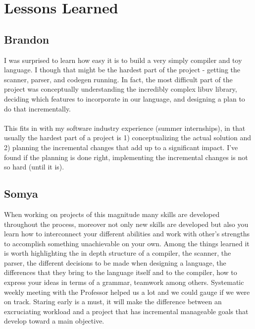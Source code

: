 \documentclass[./Report_main.tex]{subfiles}
\begin{document}


\chapter{Lessons Learned}
\section{Brandon}
I was surprised to learn how easy it is to build a very simply compiler and toy language. I though that might be the hardest part of the project - getting the scanner, parser, and codegen running. In fact, the most difficult part of the project was conceptually understanding the incredibly complex libuv library, deciding which features to incorporate in our language, and designing a plan to do that incrementally.\\\\
This fits in with my software industry experience (summer internships), in that usually the hardest part of a project is 1) conceptualizing the actual solution and 2) planning the incremental changes that add up to a significant impact. I've found if the planning is done right, implementing the incremental changes is not so hard (until it is).
\section{Somya}
When working on projects of this magnitude many skills are developed throughout the
process, moreover not only new skills are developed but also you learn how to interconnect
your different abilities and work with other's strengths to accomplish something unachievable on
your own.
Among the things learned it is worth highlighting the in depth structure of a compiler, the
scanner, the parser, the different decisions to be made when designing a language, the
differences that they bring to the language itself and to the compiler, how to express your ideas
in terms of a grammar, teamwork among others.
Systematic weekly meeting with the Professor helped us a lot and we could gauge if we were on track. Staring early is a must, it will make the difference between an excruciating workload and a
project that has incremental manageable goals that develop toward a main objective.
\end{document}
